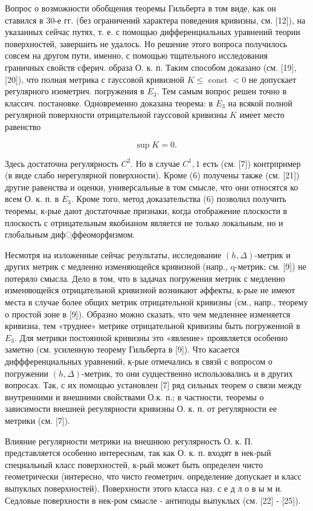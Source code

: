 \documentclass[10pt]{article}
\begin{document}
Вопрос о возможности обобщения теоремы Гильберта в том виде, как он ставился в 30-е гг. (без ограничений характера поведения кривизны, см. [12]), на указанных сейчас путях, т. е. с помощью дифференциальных уравнений теории поверхностей, завершить не удалось. Но решение этого вопроса получилось совсем на другом пути, именно, с помощью тщательного исследования граничных свойств сферич. образа О. к. п. Таким способом доказано (см. [19], [20]), что полная метрика с гауссовой кривизной $K \leqslant$ const $<0$ не допускает регулярного изометрич. погружения в $E_{3}$. Тем самым вопрос решен точно в классич. постановке. Одновременно доказана теорема: в $E_{3}$ на всякой полной регулярной поверхности отрицательной гауссовой кривизны $K$ имеет место равенство

\[
\sup K=0 \text {. }
\]

Здесь достаточна регулярность $C^{2}$. Но в случае $C^{1}, 1$ есть (см. [7]) контрпример (в виде слабо нерегулярной поверхности). Кроме (6) получены также (см. [21]) другие равенства и оценки, универсальные в том смысле, что они относятся ко всем О. к. п. в $E_{3}$. Кроме того, метод доказательства (6) позволил получить теоремы, к-рые дают достаточные признаки, когда отображение плоскости в плоскость с отрицательным якобианом является не только локальным, но и глобальным диф্ффеоморфизмом.

Несмотря на изложенные сейчас результаты, исследование $(h, \Delta)$-метрик и других метрик с медленно изменяющейся кривизной (напр., q-метрик; см. [9]) не потеряло смысла. Дело в том, что в задачах погружения метрик с медленно изменяющейся отрицательной кривизной возникают әффекты, к-рые не имеют места в случае более общих метрик отрицательной кривизны (см., напр., теорему о простой зоне в [9]). Образно можно сказать, что чем медленнее изменяется кривизна, тем «труднее» метрике отрицательной кривизны быть погруженной в $E_{3}$. Для метрики постоянной кривизны это «явление» проявляется особенно заметно (см. усиленную теорему Гильберта в [9]). Что касается диффференциальных уравнений, к-рые отмечались в связй с вопросом о погружении $(h, \Delta)$-метрик, то они суџцественно использовались и в других вопросах. Так, с их помощью установлен [7] ряд сильных теорем о связи между внутренними и внешними свойствами О.к. п.; в частности, теоремы о зависимости внешнеӥ регулярности кривизны О. к. п. от регулярности ее метрики (см. [7]).

Влияние регулярности метрики на внешнюю регулярность О. к. П. представляется особенно интересным, так как О. к. п. входят в нек-рый специальный класс поверхностей, к-рый может быть определен чисто геометрически (интересно, что чисто геометрич. определение допускает и класс выпуклых поверхностей). Поверхности этого класса наз. с е д л о в ы м и. Седловые поверхности в нек-ром смысле - антиподы выпуклых (см. [22] - [25]).
\end{document}
